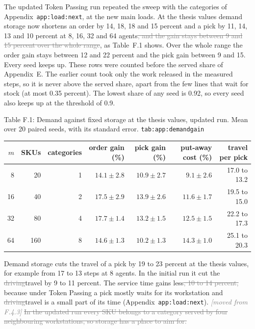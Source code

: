 \documentclass[11pt,a4paper]{article}
\newcommand{\new}[1]{\textcolor{newc}{#1}}
\newcommand{\old}[1]{\textcolor{gray}{\sout{#1}}}
\newenvironment{greenblock}{\color{newc}}{}
\newcommand{\lref}[1]{{\small\texttt{#1}}}
\newcommand{\moved}[1]{{\small\textcolor{gray}{\emph{[moved from #1]}}}}
\begin{document}
The updated Token Passing run repeated the sweep with the categories of
Appendix~\lref{app:load:next}, at the new main loads. At the thesis values
demand storage now shortens \new{an order by 14, 18, 18 and 15 percent and}
a pick by 11, 14, 13 and 10 percent at 8, 16, 32 and 64 agents\old{, and the
gain stays between 9 and 15 percent over the whole range}\new{, as
Table~F.1 shows. Over the whole range the order gain stays between 12 and 22
percent and the pick gain between 9 and 15}. Every seed keeps up. \new{These
rows were counted before the served share of Appendix~E. The earlier count
took only the work released in the measured steps, so it is never above the
served share, apart from the few lines that wait for stock (at most 0.35
percent). The lowest share of any seed is 0.92, so every seed also keeps up at
the threshold of 0.9.}

\begin{greenblock}

\begin{center}
\small
Table F.1: Demand against fixed storage at the thesis values, updated run.
Mean over 20 paired seeds, with its standard error.
\hfill\lref{tab:app:demandgain}\\[0.4em]
\begin{tabular}{rrrrrrr}
\toprule
$m$ & SKUs & categories & order gain (\%) & pick gain (\%) & put-away cost (\%) & travel per pick \\
\midrule
8  & 20  & 1 & $14.1 \pm 2.8$ & $10.9 \pm 2.7$ & $9.1 \pm 2.6$  & 17.0 to 13.2 \\
16 & 40  & 2 & $17.5 \pm 2.9$ & $13.9 \pm 2.6$ & $11.6 \pm 1.7$ & 19.5 to 15.0 \\
32 & 80  & 4 & $17.7 \pm 1.4$ & $13.2 \pm 1.5$ & $12.5 \pm 1.5$ & 22.2 to 17.3 \\
64 & 160 & 8 & $14.6 \pm 1.3$ & $10.2 \pm 1.3$ & $14.3 \pm 1.0$ & 25.1 to 20.3 \\
\bottomrule
\end{tabular}
\end{center}
\end{greenblock}

\new{Demand storage cuts the travel of a pick by 19 to 23 percent at the
thesis values,} for example from 17 to 13 steps at 8 agents. In the initial
run it cut the \old{driving}\new{travel} by 9 to 11 percent. The service time
gains less\old{, 10 to 14 percent,} because under Token Passing a pick mostly
waits for its workstation and \old{driving}\new{travel} is a small part of
its time (Appendix~\lref{app:load:next}). \moved{F.4.3}
\old{In the updated run every SKU belongs to a category served by four
neighbouring workstations, so storage has a place to aim for.}
\end{document}
